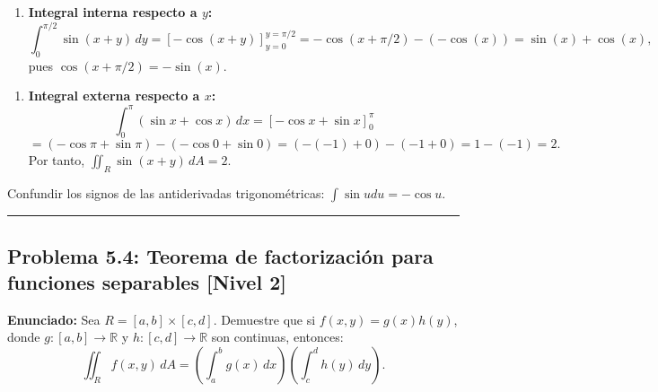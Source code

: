 \documentclass[11pt,a4paper]{article}
\begin{document}
\begin{enumerate}[label=\textbf{\arabic*.}]
\item \textbf{Integral interna respecto a $y$:}
\begin{equation*}
\int_0^{\pi/2} \sin(x + y) \, dy = [-\cos(x + y)]_{y=0}^{y=\pi/2} = -\cos(x + \pi/2) - (-\cos(x)) = \sin(x) + \cos(x),
\end{equation*}
pues $\cos(x + \pi/2) = -\sin(x)$.
\end{enumerate}

\begin{enumerate}[label=\textbf{\arabic*.}]
\item \textbf{Integral externa respecto a $x$:}
\begin{equation*}
\int_0^\pi (\sin x + \cos x) \, dx = [-\cos x + \sin x]_0^\pi
\end{equation*}
\begin{equation*}
= (-\cos\pi + \sin\pi) - (-\cos 0 + \sin 0) = (-(-1) + 0) - (-1 + 0) = 1 - (-1) = 2.
\end{equation*}
Por tanto, $\iint_R \sin(x + y) \, dA = 2$.
\end{enumerate}

\begin{trapbox}
Confundir los signos de las antiderivadas trigonométricas: $\int \sin u du = -\cos u$.
\end{trapbox}

\vspace{0.5cm}
\hrule
\vspace{0.5cm}

\subsection*{Problema 5.4: Teorema de factorización para funciones separables \hfill \color{primaryblue}\small[Nivel 2]}

\begin{tcolorbox}[colback=white,colframe=gray!40,arc=1mm,boxrule=0.5pt,left=3mm,right=3mm,top=2mm,bottom=2mm]
\textbf{Enunciado:} Sea $R = [a,b] \times [c,d]$. Demuestre que si $f(x,y) = g(x) h(y)$, donde $g: [a,b] \to \mathbb{R}$ y $h: [c,d] \to \mathbb{R}$ son continuas, entonces:
\begin{equation*}
\iint_R f(x,y) \, dA = \left( \int_a^b g(x) \, dx \right) \left( \int_c^d h(y) \, dy \right).
\end{equation*}
\end{tcolorbox}
\end{document}
